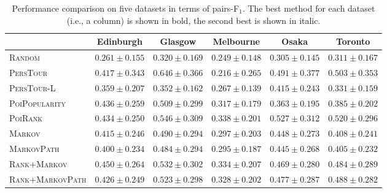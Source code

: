\begin{table*}[t]
\caption{Performance comparison on five datasets in terms of pairs-F$_1$.
        The best method for each dataset (i.e., a column) is shown in bold, the second best is shown in italic.}
\label{tab:pairf1}
\centering
\setlength{\tabcolsep}{10pt} %
\begin{tabular}{l|ccccc} \hline
 & Edinburgh & Glasgow & Melbourne & Osaka & Toronto \\ \hline
\textsc{Random} & $0.261\pm0.155$ & $0.320\pm0.169$ & $0.249\pm0.148$ & $0.305\pm0.145$ & $0.311\pm0.167$ \\
\textsc{PersTour}\cite{ijcai15} & $0.417\pm0.343$ & $\mathbf{0.646\pm0.366}$ & $0.216\pm0.265$ & $\mathit{0.491\pm0.377}$ & $\mathit{0.503\pm0.353}$ \\
\textsc{PersTour-L} & $0.359\pm0.207$ & $0.352\pm0.162$ & $0.267\pm0.139$ & $0.415\pm0.243$ & $0.331\pm0.159$ \\
\textsc{PoiPopularity} & $\mathit{0.436\pm0.259}$ & $0.509\pm0.299$ & $0.317\pm0.179$ & $0.363\pm0.195$ & $0.385\pm0.202$ \\
\textsc{PoiRank} & $0.434\pm0.250$ & $\mathit{0.546\pm0.309}$ & $\mathbf{0.338\pm0.201}$ & $\mathbf{0.527\pm0.312}$ & $\mathbf{0.520\pm0.296}$ \\
\textsc{Markov} & $0.415\pm0.246$ & $0.490\pm0.294$ & $0.297\pm0.203$ & $0.448\pm0.273$ & $0.408\pm0.241$ \\
\textsc{MarkovPath} & $0.400\pm0.234$ & $0.484\pm0.294$ & $0.295\pm0.187$ & $0.445\pm0.268$ & $0.405\pm0.232$ \\
\textsc{Rank+Markov} & $\mathbf{0.450\pm0.264}$ & $0.532\pm0.302$ & $\mathit{0.334\pm0.207}$ & $0.469\pm0.280$ & $0.484\pm0.289$ \\
\textsc{Rank+MarkovPath} & $0.426\pm0.249$ & $0.523\pm0.298$ & $0.328\pm0.202$ & $0.477\pm0.287$ & $0.488\pm0.282$ \\
\hline
\end{tabular}\captionmoveup
\end{table*}
